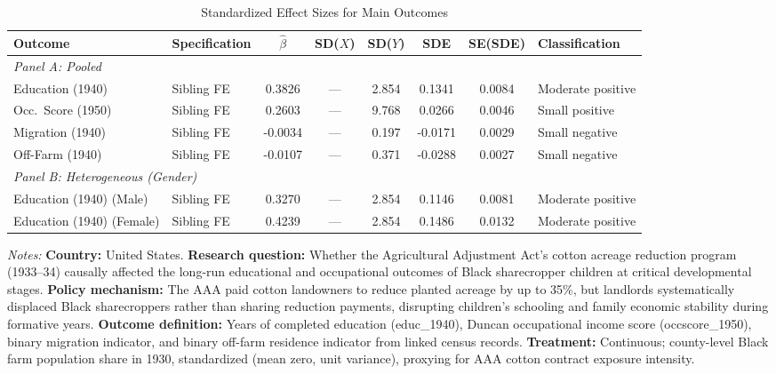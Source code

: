 \begin{table}[H]
\centering
\caption{Standardized Effect Sizes for Main Outcomes}
\label{tab:sde}
\begin{adjustbox}{max width=\textwidth}
\begin{tabular}{llcccccl}
\toprule
Outcome & Specification & $\hat{\beta}$ & SD($X$) & SD($Y$) & SDE & SE(SDE) & Classification \\
\midrule
\multicolumn{8}{l}{\textit{Panel A: Pooled}} \\
Education (1940)       & Sibling FE &   0.3826 & --- &  2.854 &   0.1341 &   0.0084 & Moderate positive \\
Occ.\ Score (1950)     & Sibling FE &   0.2603 & --- &  9.768 &   0.0266 &   0.0046 & Small positive \\
Migration (1940)       & Sibling FE &  -0.0034 & --- &  0.197 &  -0.0171 &   0.0029 & Small negative \\
Off-Farm (1940)        & Sibling FE &  -0.0107 & --- &  0.371 &  -0.0288 &   0.0027 & Small negative \\
\midrule
\multicolumn{8}{l}{\textit{Panel B: Heterogeneous (Gender)}} \\
Education (1940) (Male) & Sibling FE &   0.3270 & --- &  2.854 &   0.1146 &   0.0081 & Moderate positive \\
Education (1940) (Female) & Sibling FE &   0.4239 & --- &  2.854 &   0.1486 &   0.0132 & Moderate positive \\
\bottomrule
\end{tabular}
\end{adjustbox}
\par\vspace{0.3em}
{\footnotesize \textit{Notes:}
\textbf{Country:} United States.
\textbf{Research question:} Whether the Agricultural Adjustment Act's cotton acreage reduction program (1933--34) causally affected the long-run educational and occupational outcomes of Black sharecropper children at critical developmental stages.
\textbf{Policy mechanism:} The AAA paid cotton landowners to reduce planted acreage by up to 35\%, but landlords systematically displaced Black sharecroppers rather than sharing reduction payments, disrupting children's schooling and family economic stability during formative years.
\textbf{Outcome definition:} Years of completed education (educ\_1940), Duncan occupational income score (occscore\_1950), binary migration indicator, and binary off-farm residence indicator from linked census records.
\textbf{Treatment:} Continuous; county-level Black farm population share in 1930, standardized (mean zero, unit variance), proxying for AAA cotton contract exposure intensity.
}
\end{table}
